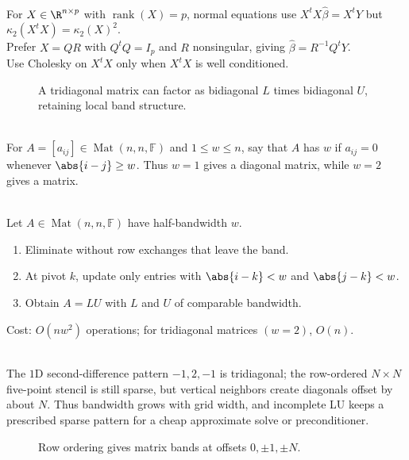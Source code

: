 \begin{perspective} \label{per:linear-model-numerical-solution-route} \\
For $X\in\R^{n\times p}$ with $\operatorname{rank}(X)=p$, normal equations use $X^tX\widehat{\beta}=X^tY$ but $\kappa_2(X^tX)=\kappa_2(X)^2$.\\
Prefer $X=QR$ with $Q^tQ=I_p$ and $R$ nonsingular, giving $\widehat{\beta}=R^{-1}Q^tY$.\\
Use Cholesky on $X^tX$ only when $X^tX$ is well conditioned.
\end{perspective}

\begin{figure}[H]
  \centering
  
  \caption{A tridiagonal matrix can factor as bidiagonal $L$ times bidiagonal $U$, retaining local band structure.}
  \label{fig:band-matrix-lu-structure}
\end{figure}

\begin{definition} \label{def:band-and-tridiagonal-matrix} \\
For $A=[a_{ij}]\in\operatorname{Mat}(n,n,\mathbb{F})$ and $1\leq w\leq n$, say that $A$ has  $w$ if $a_{ij}=0$ whenever $\abs{i-j}\geq w$. Thus $w=1$ gives a diagonal matrix, while $w=2$ gives a  matrix.
\end{definition}

\begin{method} \label{meth:banded-elimination-preview} \\
Let $A\in\operatorname{Mat}(n,n,\mathbb{F})$ have half-bandwidth $w$.
\begin{enumerate}[label=(\roman*)]
\setlength{\itemsep}{0pt}
\item Eliminate without row exchanges that leave the band.
\item At pivot $k$, update only entries with $\abs{i-k}<w$ and $\abs{j-k}<w$.
\item Obtain $A=LU$ with $L$ and $U$ of comparable bandwidth.
\end{enumerate}
Cost: $O(nw^2)$ operations; for tridiagonal matrices $(w=2)$, $O(n)$.
\end{method}

\begin{perspective} \label{per:five-point-stencil-bandwidth} \\
The $1$D second-difference pattern $-1,2,-1$ is tridiagonal; the row-ordered $N\times N$ five-point stencil is still sparse, but vertical neighbors create diagonals offset by about $N$. Thus bandwidth grows with grid width, and incomplete LU keeps a prescribed sparse pattern for a cheap approximate solve or preconditioner.
\end{perspective}

\begin{figure}[H]
  \centering
  
  \caption{Row ordering gives matrix bands at offsets $0,\pm1,\pm N$.}
  \label{fig:five-point-stencil-bandwidth}
\end{figure}
